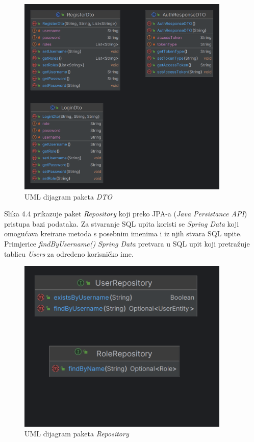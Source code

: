			\begin{figure}[htbp]
				\centering
				\includegraphics[width=0.9\textwidth]{slike/dtoUML}
				\caption{UML dijagram paketa \textit{DTO}}
				\label{fig:dtoUML}
			\end{figure}
			
			Slika 4.4 prikazuje paket \textit{Repository} koji preko JPA-a (\textit{Java Persistance API}) pristupa bazi podataka. Za stvaranje SQL upita koristi se \textit{Spring Data} koji omogućava kreirane metoda s posebnim imenima i iz njih stvara SQL upite. Primjerice \textit{findByUsername()} \textit{Spring Data} pretvara u SQL upit koji pretražuje tablicu \textit{Users} za određeno korisničko ime.
			
			\begin{figure}[htbp]
				\centering
				\includegraphics[width=0.9\textwidth]{slike/repoUML}
				\caption{UML dijagram paketa \textit{Repository}}
				\label{fig:repoUML}
			\end{figure}
			
